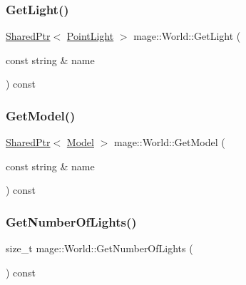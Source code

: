 \hypertarget{classmage_1_1_world_ac7c1a382b10e67bd42493af3966c9212}{}\label{classmage_1_1_world_ac7c1a382b10e67bd42493af3966c9212} 
\subsubsection{\texorpdfstring{Get\+Light()}{GetLight()}}
{\footnotesize\ttfamily \hyperlink{namespacemage_a1e01ae66713838a7a67d30e44c67703e}{Shared\+Ptr}$<$ \hyperlink{structmage_1_1_point_light}{Point\+Light} $>$ mage\+::\+World\+::\+Get\+Light (\begin{DoxyParamCaption}\item[{const string \&}]{name }\end{DoxyParamCaption}) const}

\hypertarget{classmage_1_1_world_ac91abee028df87d8879332e0df3d9e8a}{}\label{classmage_1_1_world_ac91abee028df87d8879332e0df3d9e8a} 
\subsubsection{\texorpdfstring{Get\+Model()}{GetModel()}}
{\footnotesize\ttfamily \hyperlink{namespacemage_a1e01ae66713838a7a67d30e44c67703e}{Shared\+Ptr}$<$ \hyperlink{classmage_1_1_model}{Model} $>$ mage\+::\+World\+::\+Get\+Model (\begin{DoxyParamCaption}\item[{const string \&}]{name }\end{DoxyParamCaption}) const}

\hypertarget{classmage_1_1_world_a786420d8d8b97065ee591753b7f1541b}{}\label{classmage_1_1_world_a786420d8d8b97065ee591753b7f1541b} 
\subsubsection{\texorpdfstring{Get\+Number\+Of\+Lights()}{GetNumberOfLights()}}
{\footnotesize\ttfamily size\+\_\+t mage\+::\+World\+::\+Get\+Number\+Of\+Lights (\begin{DoxyParamCaption}{ }\end{DoxyParamCaption}) const}

